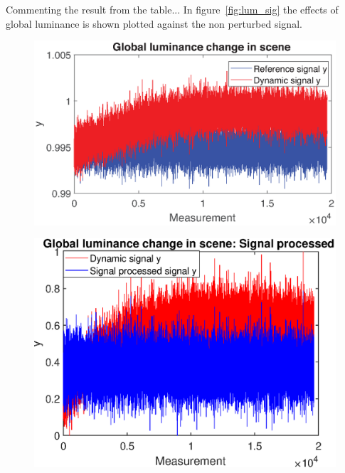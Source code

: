 Commenting the result from the table... In figure~\ref{fig:lum_sig} the effects of global luminance is shown plotted against the non perturbed signal.\\[0.1in]


\begin{figure}[H]
    \centering
\begin{minipage}[t]{0.55\textwidth}
    \includegraphics[width=1\textwidth]{result/dynamic/lum/intense_change1.eps}
    \label{fig:lum_sig_1}
\end{minipage}
\begin{minipage}[t]{0.44\textwidth}
    \includegraphics[width = \textwidth]{result/dynamic/lum/intense_change_sp.eps}
    \label{fig:lum_sig_2}
\end{minipage}
\begin{minipage}[t]{0.495\textwidth}

\end{minipage}
\end{figure}
